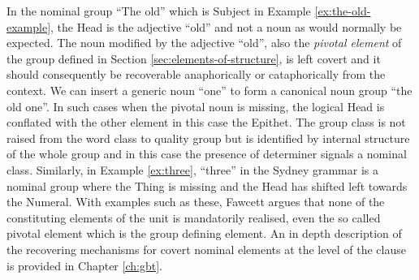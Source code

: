 In the nominal group ``The old'' which is Subject in Example \ref{ex:the-old-example}, the Head is the adjective ``old'' and not a noun as would normally be expected. The noun modified by the adjective ``old'', also the \textit{pivotal element} of the group defined in Section \ref{sec:elements-of-structure}, is left covert and it should consequently be recoverable anaphorically or cataphorically from the context. We can insert a generic noun ``one'' to form a canonical noun group ``the old one''. In such cases when the pivotal noun is missing, the logical Head is conflated with the other element in this case the Epithet. The group class is not raised from the word class to quality group but is identified by internal structure  of the whole group and in this case the presence of determiner signals a nominal class. Similarly, in Example \ref{ex:three}, ``three'' in the Sydney grammar is a nominal group where the Thing is missing and the Head has shifted left towards the Numeral. With examples such as these, Fawcett argues that none of the constituting elements of the unit is mandatorily realised, even the so called pivotal element which is the group defining element. An in depth description of the recovering mechanisms for covert nominal elements at the level of the clause is provided in Chapter \ref{ch:gbt}.

 

